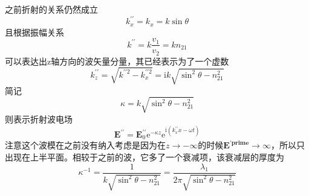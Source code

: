         之前折射的关系仍然成立\[k^{\prime\prime}_x =k_x=k \sin \theta \]且根据振幅关系\[k^{\prime\prime}= k \frac{v_1}{v_2}=k n_{21}\]可以表达出z轴方向的波矢量分量，其已经表示为了一个虚数
        \begin{equation}
            k_{z}^{\prime \prime}=\sqrt{k^{\prime \prime 2}-k_{x}^{\prime \prime 2}}=\mathrm{i} k \sqrt{\sin ^{2} \theta-n_{21}^{2}}
        \end{equation}
        简记\[ \kappa=k \sqrt{\sin ^{2} \theta-n_{21}^{2}}\]则表示折射波电场
        \begin{equation}
            \boldsymbol{E}^{\prime \prime}=\boldsymbol{E}_{0}^{\prime \prime} \mathrm{e}^{-\kappa z} \mathrm{e}^{\mathrm{i}\left(k_{x}^{\prime \prime} x-\omega t\right)}
        \end{equation}
        注意这个波模在之前没有纳入考虑是因为在$z \to -\infty$的时候$ \boldsymbol{E^{\prime prime} \to \infty}$，所以只出现在上半平面。相较于之前的波，它多了一个衰减项，该衰减层的厚度为
        \begin{equation}
            \kappa^{-1} = \frac{1}{k\sqrt{\sin ^2 \theta - n_{21}^2}}= \frac{\lambda_1}{2 \pi \sqrt{\sin ^2 \theta - n_{21}^2}}
        \end{equation}


